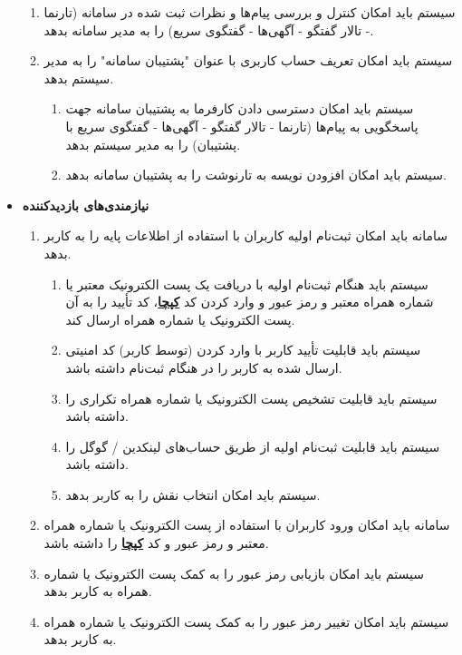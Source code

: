 \documentclass[12pt]{article}
\begin{document}
\begin{itemize}
\begin{enumerate}
			\item سیستم باید امکان کنترل و بررسی پیام‌ها و نظرات ثبت شده در سامانه (تارنما - تالار گفتگو - آگهی‌ها - گفتگوی سریع) را به مدیر سامانه بدهد.
			\item سیستم باید امکان تعریف حساب کاربری با عنوان "پشتیبان سامانه" را به مدیر سیستم بدهد.
			\begin{enumerate}
				\renewcommand{\labelenumii}{-R\arabic{enumi}.\arabic{enumii}}
				\item سیستم باید امکان دسترسی دادن کارفرما به پشتیبان سامانه جهت پاسخگویی به پیام‌ها (تارنما - تالار گفتگو - آگهی‌ها - گفتگوی سریع با پشتیبان) را به مدیر سیستم بدهد.
				\item سیستم باید امکان افزودن نویسه به تارنوشت را به پشتیبان سامانه بدهد.
			\end{enumerate}
		\end{enumerate}
		\item
		\textbf{نیازمندی‌های بازدید‌کننده}
		\begin{enumerate}
			\renewcommand{\labelenumi}{-R\arabic{enumi}}
			\setcounter{enumi}{14}
			\item سامانه باید امکان ثبت‌نام اولیه کاربران با استفاده از اطلاعات پایه را به کاربر بدهد.
			\begin{enumerate}
				\renewcommand{\labelenumii}{-R\arabic{enumi}.\arabic{enumii}}
				\item سیستم باید هنگام ثبت‌نام اولیه با دریافت یک‌ پست الکترونیک معتبر یا شماره همراه معتبر و رمز عبور و وارد کردن کد \textbf{\hyperref[ref:captcha]{کپچا}}، کد تأیید را به آن پست الکترونیک یا شماره همراه ارسال کند.
				\item سیستم باید قابلیت تأیید کاربر با وارد کردن (توسط کاربر) کد امنیتی ارسال شده به کاربر را در هنگام ثبت‌نام داشته باشد.
				\item سیستم باید قابلیت تشخیص پست الکترونیک یا شماره همراه تکراری را داشته باشد.
				\item سیستم باید قابلیت ثبت‌نام اولیه از طریق حساب‌های لینکدین / گوگل را داشته باشد.
				\item سیستم باید امکان انتخاب نقش را به کاربر بدهد.
			\end{enumerate}
			\item سامانه باید امکان ورود کاربران با استفاده از پست الکترونیک یا شماره همراه معتبر و رمز عبور و کد \textbf{\hyperref[ref:captcha]{کپچا}} را داشته باشد.
			\item سیستم باید امکان بازیابی رمز عبور را به کمک پست الکترونیک یا شماره همراه به کاربر بدهد.
			\item سیستم باید امکان تغییر رمز عبور را به کمک پست الکترونیک یا شماره همراه به کاربر بدهد.

\end{enumerate}
\end{itemize}
\end{document}
